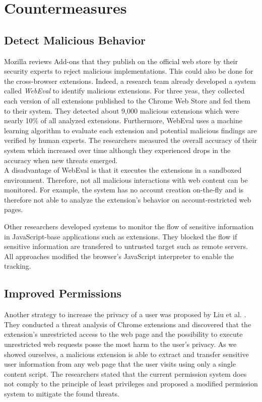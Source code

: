 
\chapter{Countermeasures}

	

\section{Detect Malicious Behavior}
	
	Mozilla reviews Add-ons that they publish on the official web store by their security experts to reject malicious implementations. This could also be done for the cross-browser extensions. Indeed, a research team already developed a system called \textit{WebEval} to identify malicious extensions. For three yeas, they collected each version of all extensions published to the Chrome Web Store and fed them to their system. They detected about 9,000 malicious extensions which were nearly 10\% of all analyzed extensions. Furthermore, WebEval uses a machine learning algorithm to evaluate each extension and potential malicious findings are verified by human experts. The researchers measured the overall accuracy of their system which increased over time although they experienced drops in the accuracy when new threats emerged. \\
	A disadvantage of WebEval is that it executes the extensions in a sandboxed environment. Therefore, not all malicious interactions with web content can be monitored. For example, the system has no account creation on-the-fly and is therefore not able to analyze the extension's behavior on account-restricted web pages.
	
	Other researchers developed systems to monitor the flow of sensitive information \cite{Dhawan:2009:AIF:1723192.1723250, Hallaraker:2005:DMJ:1078029.1078861, cs2015sentinel,ndss2007xss} in JavaScript-base applications such as extensions. They blocked the flow if sensitive information are transfered to untrusted target such as remote servers. All approaches modified the browser's JavaScript interpreter to enable the tracking.

\section{Improved Permissions}

	Another strategy to increase the privacy of a user was proposed by Liu et al. \cite{Liu12chromeextensions:}. They conducted a threat analysis of Chrome extensions and discovered that the extension's unrestricted access to the web page and the possibility to execute unrestricted web requests posse the most harm to the user's privacy. As we showed ourselves, a malicious extension is able to extract and transfer sensitive user information from any web page that the user visits using only a single content script. The researchers stated that the current permission system does not comply to the principle of least privileges and proposed a modified permission system to mitigate the found threats. 
	
